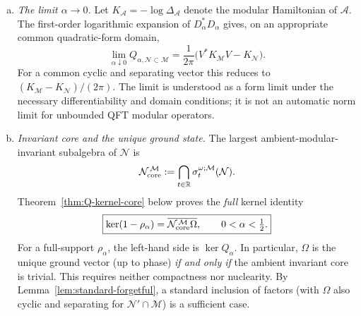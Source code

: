 \documentclass[a4paper,11pt]{article}
\theoremstyle{definition}
\newcommand{\mA}{\mathcal{A}}%
\newcommand{\mN}{\mathcal{N}}
\newcommand{\mM}{\mathcal{M}}
\begin{document}
\begin{enumerate}[(a)]
\item \emph{The limit $\alpha\to0$.}
Let $K_\mA=-\log\Delta_\mA$ denote the modular Hamiltonian of
$\mA$. The first-order logarithmic expansion of $D_\alpha^*D_\alpha$
gives, on an appropriate common quadratic-form domain,
\begin{equation}
    \boxed{
    \lim_{\alpha\downarrow0}Q_{\alpha,\mN\subset\mM}
    =\frac1{2\pi}
    \bigl(V^*K_\mM V-K_\mN\bigr).
    }
    \label{eq:Q-alpha-zero}
\end{equation}
For a common cyclic and separating vector this reduces to
$(K_\mM-K_\mN)/(2\pi)$. The limit is understood as a form limit
under the necessary differentiability and domain conditions; it is
not an automatic norm limit for unbounded QFT modular operators.

\item \emph{Invariant core and the unique ground state.}
The largest ambient-modular-invariant subalgebra of $\mN$ is
\begin{equation}
    \mN_{\rm core}^{\,\mM}
    :=\bigcap_{t\in\mathbb R}\sigma_t^{\omega;\mM}(\mN).
    \label{eq:Q-core-property}
\end{equation}
Theorem~\ref{thm:Q-kernel-core} below proves the \emph{full} kernel identity
\begin{equation}
    \boxed{\ker(1-\rho_\alpha)
    =\overline{\mN_{\rm core}^{\,\mM}\Omega},
    \qquad 0<\alpha<\tfrac12.}
    \label{eq:Q-full-kernel}
\end{equation}
For a full-support $\rho_\alpha$, the left-hand side is
$\ker Q_\alpha$. In particular, $\Omega$ is the unique ground vector
(up to phase) \emph{if and only if} the ambient invariant core is trivial.
This requires neither compactness nor nuclearity. By
Lemma~\ref{lem:standard-forgetful}, a standard inclusion of factors
(with $\Omega$ also cyclic and separating for $\mN'\cap\mM$)
is a sufficient case.


\end{enumerate}
\end{document}
